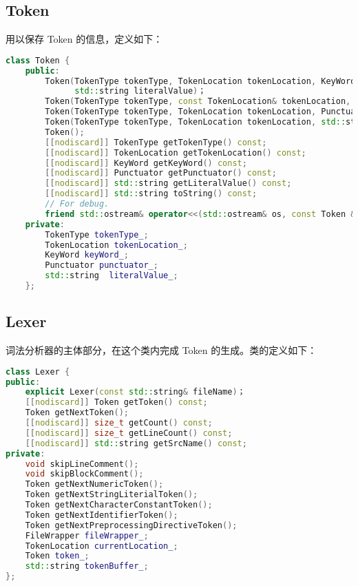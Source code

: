 \documentclass[blue,normal,cn]{elegantnote}
\begin{document}
\subsection{Token}

用以保存 Token 的信息，定义如下：

\begin{lstlisting}[language=C++]
class Token {
    public:
        Token(TokenType tokenType, TokenLocation tokenLocation, KeyWord keyWord, Punctuator punctuator,
              std::string literalValue)；
        Token(TokenType tokenType, const TokenLocation& tokenLocation, KeyWord keyWord);
        Token(TokenType tokenType, TokenLocation tokenLocation, Punctuator punctuator);
        Token(TokenType tokenType, TokenLocation tokenLocation, std::string literalValue);
        Token();
        [[nodiscard]] TokenType getTokenType() const;
        [[nodiscard]] TokenLocation getTokenLocation() const;
        [[nodiscard]] KeyWord getKeyWord() const;
        [[nodiscard]] Punctuator getPunctuator() const;
        [[nodiscard]] std::string getLiteralValue() const;
        [[nodiscard]] std::string toString() const;
        // For debug.
        friend std::ostream& operator<<(std::ostream& os, const Token & token);
    private:
        TokenType tokenType_;
        TokenLocation tokenLocation_;
        KeyWord keyWord_;
        Punctuator punctuator_;
        std::string  literalValue_;
    };
\end{lstlisting}


\subsection{Lexer}

词法分析器的主体部分，在这个类内完成 Token 的生成。类的定义如下：

\begin{lstlisting}[language=C++]
class Lexer {
public:
    explicit Lexer(const std::string& fileName)；
    [[nodiscard]] Token getToken() const;
    Token getNextToken();
    [[nodiscard]] size_t getCount() const;
    [[nodiscard]] size_t getLineCount() const;
    [[nodiscard]] std::string getSrcName() const;
private:
    void skipLineComment();
    void skipBlockComment();
    Token getNextNumericToken();
    Token getNextStringLiterialToken();
    Token getNextCharacterConstantToken();
    Token getNextIdentifierToken();
    Token getNextPreprocessingDirectiveToken();
    FileWrapper fileWrapper_;
    TokenLocation currentLocation_;
    Token token_;
    std::string tokenBuffer_;
};
\end{lstlisting}
\end{document}
